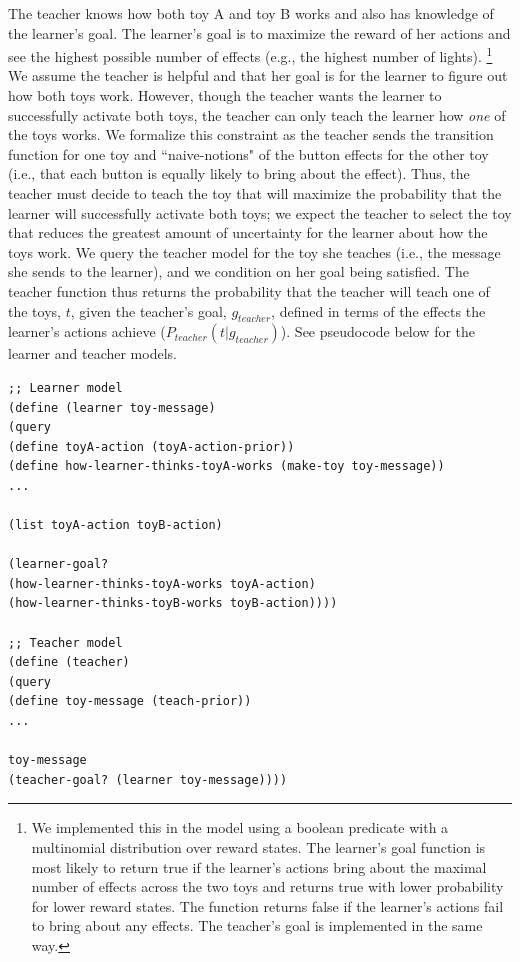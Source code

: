 \documentclass[10pt,letterpaper]{article}
\begin{document}
The teacher knows how both toy A and toy B works and also has knowledge of the learner's goal. 
The learner's goal is to maximize the reward of her actions and see the highest possible number of effects (e.g., the highest number of lights).  
\footnote{We implemented this in the model using a boolean predicate with a multinomial distribution over reward states. The learner's goal function is most likely to return true if the learner's actions bring about the maximal number of effects across the two toys and returns true with lower probability for lower reward states. The function returns false if the learner's actions fail to bring about any effects. The teacher's goal is implemented in the same way.}
We assume the teacher is helpful and that her goal is for the learner to figure out how both toys work.
However, though the teacher wants the learner to successfully activate both toys, the teacher can only teach the learner how \textit{one} of the toys works. We formalize this constraint as the teacher sends the transition function for one toy and ``naive-notions" of the button effects for the other toy (i.e., that each button is equally likely to bring about the effect). Thus, the teacher must decide to teach the toy that will maximize the probability that the learner will successfully activate both toys; we expect the teacher to select the toy that reduces the greatest amount of uncertainty for the learner about how the toys work. We query the teacher model for the toy she teaches (i.e., the message she sends to the learner), and we condition on her goal being satisfied. The teacher function thus returns the probability that the teacher will teach one of the toys, $t$, given the teacher's goal, $g_{teacher}$, defined in terms of the effects the learner's actions achieve ($P_{teacher}(t | g_{teacher})$). 
See pseudocode below for the learner and teacher models.

\begin{lstlisting}
;; Learner model
(define (learner toy-message)
(query
(define toyA-action (toyA-action-prior))
(define how-learner-thinks-toyA-works (make-toy toy-message))
...

(list toyA-action toyB-action) 

(learner-goal? 			
(how-learner-thinks-toyA-works toyA-action) 
(how-learner-thinks-toyB-works toyB-action))))

;; Teacher model
(define (teacher)
(query
(define toy-message (teach-prior))
...

toy-message 
(teacher-goal? (learner toy-message))))
\end{lstlisting}
\end{document}
